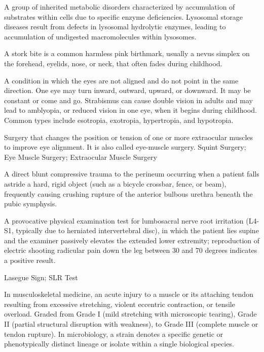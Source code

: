  A group of inherited metabolic disorders characterized by accumulation of substrates
within cells due to specific enzyme deficiencies. Lysosomal storage diseases result from
defects in lysosomal hydrolytic enzymes, leading to accumulation of undigested
macromolecules within lysosomes.

 A stork bite is a common harmless pink birthmark, usually a nevus simplex on the forehead, eyelids, nose, or neck, that often fades during childhood.

 A condition in which the eyes are not aligned and do not point in the same direction. One eye may turn inward, outward, upward, or downward. It may be constant or come and go. Strabismus can cause double vision in adults and may lead to amblyopia, or reduced vision in one eye, when it begins during childhood. Common types include esotropia, exotropia, hypertropia, and hypotropia.

 Surgery that changes the position or tension of one or more extraocular muscles to improve eye alignment. It is also called eye-muscle surgery.
\synonyms
Squint Surgery; Eye Muscle Surgery; Extraocular Muscle Surgery

 A direct blunt compressive trauma to the perineum occurring when a patient falls astride a hard, rigid object (such as a bicycle crossbar, fence, or beam), frequently causing crushing rupture of the anterior bulbous urethra beneath the pubic symphysis.

 A provocative physical examination test for lumbosacral nerve root irritation (L4-S1, typically due to herniated intervertebral disc), in which the patient lies supine and the examiner passively elevates the extended lower extremity; reproduction of electric shooting radicular pain down the leg between 30 and 70 degrees indicates a positive result.

\synonyms
Lasegue Sign; SLR Test

 In musculoskeletal medicine, an acute injury to a muscle or its attaching tendon resulting from excessive stretching, violent eccentric contraction, or tensile overload. Graded from Grade I (mild stretching with microscopic tearing), Grade II (partial structural disruption with weakness), to Grade III (complete muscle or tendon rupture). In microbiology, a strain denotes a specific genetic or phenotypically distinct lineage or isolate within a single biological species.

